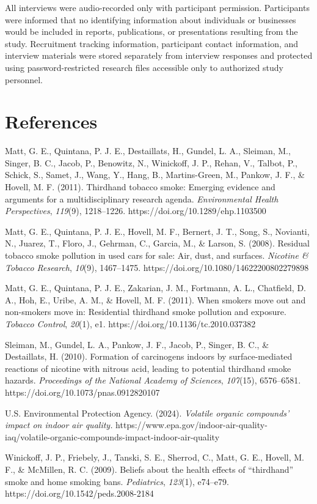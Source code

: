 \documentclass[stu]{apa7}
\begin{document}
All interviews were audio-recorded only with participant permission. Participants were informed that no identifying information about individuals or businesses would be included in reports, publications, or presentations resulting from the study. Recruitment tracking information, participant contact information, and interview materials were stored separately from interview responses and protected using password-restricted research files accessible only to authorized study personnel.

\section{References}

\noindent\hangindent=0.5in Matt, G. E., Quintana, P. J. E., Destaillats, H., Gundel, L. A., Sleiman, M., Singer, B. C., Jacob, P., Benowitz, N., Winickoff, J. P., Rehan, V., Talbot, P., Schick, S., Samet, J., Wang, Y., Hang, B., Martins-Green, M., Pankow, J. F., \& Hovell, M. F. (2011). Thirdhand tobacco smoke: Emerging evidence and arguments for a multidisciplinary research agenda. \textit{Environmental Health Perspectives}, \textit{119}(9), 1218--1226. https://doi.org/10.1289/ehp.1103500

\noindent\hangindent=0.5in Matt, G. E., Quintana, P. J. E., Hovell, M. F., Bernert, J. T., Song, S., Novianti, N., Juarez, T., Floro, J., Gehrman, C., Garcia, M., \& Larson, S. (2008). Residual tobacco smoke pollution in used cars for sale: Air, dust, and surfaces. \textit{Nicotine \& Tobacco Research}, \textit{10}(9), 1467--1475. https://doi.org/10.1080/14622200802279898

\noindent\hangindent=0.5in Matt, G. E., Quintana, P. J. E., Zakarian, J. M., Fortmann, A. L., Chatfield, D. A., Hoh, E., Uribe, A. M., \& Hovell, M. F. (2011). When smokers move out and non-smokers move in: Residential thirdhand smoke pollution and exposure. \textit{Tobacco Control}, \textit{20}(1), e1. https://doi.org/10.1136/tc.2010.037382

\noindent\hangindent=0.5in Sleiman, M., Gundel, L. A., Pankow, J. F., Jacob, P., Singer, B. C., \& Destaillats, H. (2010). Formation of carcinogens indoors by surface-mediated reactions of nicotine with nitrous acid, leading to potential thirdhand smoke hazards. \textit{Proceedings of the National Academy of Sciences}, \textit{107}(15), 6576--6581. https://doi.org/10.1073/pnas.0912820107

\noindent\hangindent=0.5in U.S. Environmental Protection Agency. (2024). \textit{Volatile organic compounds' impact on indoor air quality.} https://www.epa.gov/indoor-air-quality-iaq/volatile-organic-compounds-impact-indoor-air-quality

\noindent\hangindent=0.5in Winickoff, J. P., Friebely, J., Tanski, S. E., Sherrod, C., Matt, G. E., Hovell, M. F., \& McMillen, R. C. (2009). Beliefs about the health effects of ``thirdhand'' smoke and home smoking bans. \textit{Pediatrics}, \textit{123}(1), e74--e79. https://doi.org/10.1542/peds.2008-2184
\end{document}

